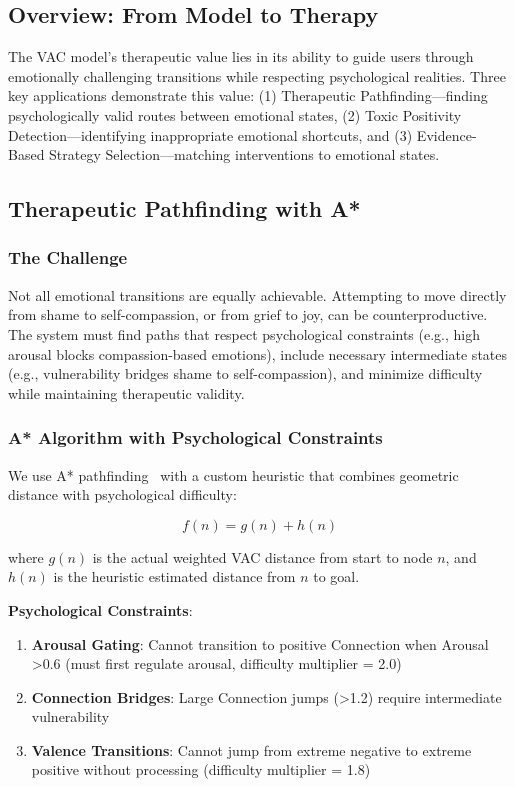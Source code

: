 \subsection{Overview: From Model to Therapy}

The VAC model's therapeutic value lies in its ability to guide users through emotionally challenging transitions while respecting psychological realities. Three key applications demonstrate this value: (1) Therapeutic Pathfinding—finding psychologically valid routes between emotional states, (2) Toxic Positivity Detection—identifying inappropriate emotional shortcuts, and (3) Evidence-Based Strategy Selection—matching interventions to emotional states.

\subsection{Therapeutic Pathfinding with A*}

\subsubsection{The Challenge}

Not all emotional transitions are equally achievable. Attempting to move directly from shame to self-compassion, or from grief to joy, can be counterproductive. The system must find paths that respect psychological constraints (e.g., high arousal blocks compassion-based emotions), include necessary intermediate states (e.g., vulnerability bridges shame to self-compassion), and minimize difficulty while maintaining therapeutic validity.

\subsubsection{A* Algorithm with Psychological Constraints}

We use A* pathfinding~\cite{hart1968} with a custom heuristic that combines geometric distance with psychological difficulty:

$$f(n) = g(n) + h(n)$$

where $g(n)$ is the actual weighted VAC distance from start to node $n$, and $h(n)$ is the heuristic estimated distance from $n$ to goal.

\textbf{Psychological Constraints}:

\begin{enumerate}
    \item \textbf{Arousal Gating}: Cannot transition to positive Connection when Arousal >0.6 (must first regulate arousal, difficulty multiplier = 2.0)
    \item \textbf{Connection Bridges}: Large Connection jumps (>1.2) require intermediate vulnerability
    \item \textbf{Valence Transitions}: Cannot jump from extreme negative to extreme positive without processing (difficulty multiplier = 1.8)
\end{enumerate}


